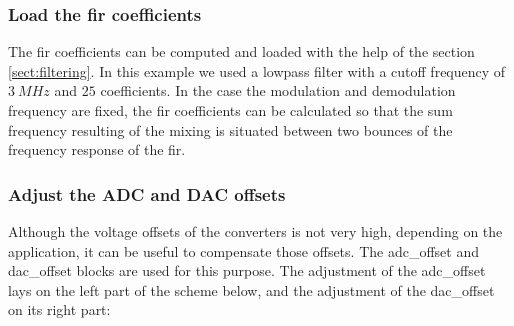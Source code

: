 \documentclass[12pt,oneside]{article}
\begin{document}
\subsubsection{Load the fir coefficients}

The fir coefficients can be computed and loaded with the help of the section \ref{sect:filtering}. In this example we used a lowpass filter with a cutoff frequency of $3~MHz$ and $25$ coefficients. In the case the modulation and demodulation frequency are fixed, the fir coefficients can be calculated so that the sum frequency resulting of the mixing is situated between two bounces of the frequency response of the fir. 

\subsubsection{Adjust the ADC and DAC offsets}

Although the voltage offsets of the converters is not very high, depending on the application, it can be useful to compensate those offsets. The adc\_offset and dac\_offset blocks are used for this purpose. The adjustment of the adc\_offset lays on the left part of the scheme below, and the adjustment of the dac\_offset on its right part:
\end{document}
